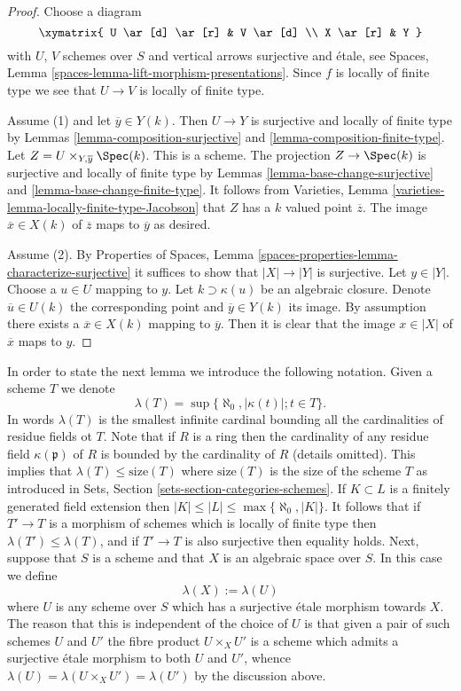 \begin{proof}
Choose a diagram
$$
\xymatrix{
U \ar[d] \ar[r] & V \ar[d] \\
X \ar[r] & Y
}
$$
with $U$, $V$ schemes over $S$ and vertical arrows surjective
and \'etale, see
Spaces, Lemma \ref{spaces-lemma-lift-morphism-presentations}.
Since $f$ is locally of finite type we see that $U \to V$ is locally of
finite type.

\medskip\noindent
Assume (1) and let $\overline{y} \in Y(k)$. Then $U \to Y$ is
surjective and locally of finite type by
Lemmas \ref{lemma-composition-surjective} and
\ref{lemma-composition-finite-type}.
Let $Z = U \times_{Y, \overline{y}} \Spec(k)$. This is a scheme.
The projection $Z \to \Spec(k)$
is surjective and locally of finite type by
Lemmas \ref{lemma-base-change-surjective} and
\ref{lemma-base-change-finite-type}.
It follows from
Varieties, Lemma \ref{varieties-lemma-locally-finite-type-Jacobson}
that $Z$ has a $k$ valued point $\overline{z}$. The image
$\overline{x} \in X(k)$ of $\overline{z}$ maps to $\overline{y}$
as desired.

\medskip\noindent
Assume (2). By
Properties of Spaces,
Lemma \ref{spaces-properties-lemma-characterize-surjective}
it suffices to show that $|X| \to |Y|$ is surjective.
Let $y \in |Y|$. Choose a $u \in U$ mapping to $y$.
Let $k \supset \kappa(u)$ be an algebraic closure. Denote
$\overline{u} \in U(k)$ the corresponding point and
$\overline{y} \in Y(k)$ its image. By assumption there exists
a $\overline{x} \in X(k)$ mapping to $\overline{y}$.
Then it is clear that the image $x \in |X|$ of $\overline{x}$
maps to $y$.
\end{proof}

\noindent
In order to state the next lemma we introduce the following
notation. Given a scheme $T$ we denote
$$
\lambda(T) = \sup\{\aleph_0, |\kappa(t)| ; t \in T\}.
$$
In words $\lambda(T)$ is the smallest infinite cardinal bounding
all the cardinalities of residue fields ot $T$. Note that if $R$
is a ring then the cardinality of any residue field $\kappa(\mathfrak p)$
of $R$ is bounded by the cardinality of $R$ (details omitted).
This implies that $\lambda(T) \leq \text{size}(T)$ where
$\text{size}(T)$ is the size of the scheme $T$ as introduced in
Sets, Section \ref{sets-section-categories-schemes}.
If $K \subset L$ is a finitely generated field extension then
$|K| \leq |L| \leq \max\{\aleph_0, |K|\}$. It follows that if $T' \to T$
is a morphism of schemes which is locally of finite
type then $\lambda(T') \leq \lambda(T)$, and if $T' \to T$ is also
surjective then equality holds. Next, suppose that $S$ is a scheme
and that $X$ is an algebraic space over $S$. In this case we define
$$
\lambda(X) := \lambda(U)
$$
where $U$ is any scheme over $S$ which has a surjective \'etale morphism
towards $X$. The reason that this is independent of the choice of $U$
is that given a pair of such schemes $U$ and $U'$ the fibre product
$U \times_X U'$ is a scheme which admits a surjective \'etale morphism
to both $U$ and $U'$, whence $\lambda(U) = \lambda(U \times_X U') =
\lambda(U')$ by the discussion above.


